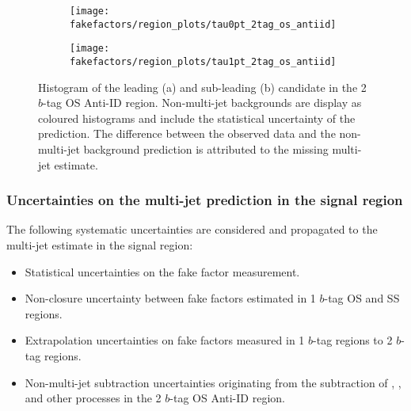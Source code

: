 
\begin{figure}[htbp]
  \centering

  \begin{subfigure}{0.49\textwidth}
    \texttt{[image: fakefactors/region\_plots/tau0pt\_2tag\_os\_antiid]}
    \subcaption{}
  \end{subfigure}
  \begin{subfigure}{0.49\textwidth}
    \texttt{[image: fakefactors/region\_plots/tau1pt\_2tag\_os\_antiid]}
    \subcaption{}
  \end{subfigure}

  \caption{Histogram of the leading (a) and sub-leading (b) \tauhadvis
    candidate \pT in the 2 $b$-tag OS Anti-ID region. Non-multi-jet
    backgrounds are display as coloured histograms and include the
    statistical uncertainty of the prediction. The difference between
    the observed data and the non-multi-jet background prediction is
    attributed to the missing multi-jet estimate.}
  \label{fig:mjfakes_2tag_os_antiid}
\end{figure}


\subsubsection{Uncertainties on the multi-jet prediction in the
  \hadhad signal region}

%

The following systematic uncertainties are considered and propagated
to the multi-jet estimate in the \hadhad signal region:
\begin{itemize}

\item Statistical uncertainties on the fake factor measurement.

\item Non-closure uncertainty between fake factors estimated in 1
  $b$-tag OS and SS regions.

\item Extrapolation uncertainties on fake factors measured in 1
  $b$-tag regions to 2 $b$-tag regions.

\item Non-multi-jet subtraction uncertainties originating from the
  subtraction of \ttbar, \ttbarFakes, and other processes in the 2
  $b$-tag OS Anti-ID region.

\end{itemize}

